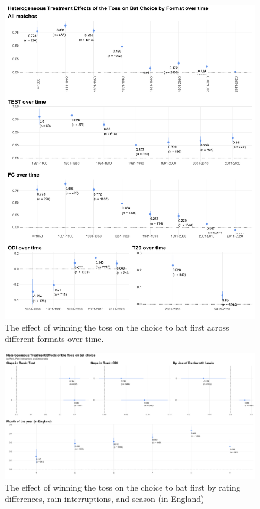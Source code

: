 \documentclass[12pt, letterpaper]{article}
\begin{document}
\begin{figure}
 \centering
 \includegraphics[scale=.5]{output/first_stage_by_format_overtime.pdf}
 \caption{The effect of winning the toss on the choice to bat first across different formats over time.}
 \label{fig:fs_het_TE2}
\end{figure}

\clearpage

\begin{figure}
 \centering
 \includegraphics[scale=.5]{output/first_stage_by_rank_dl_season.pdf}
 \caption{The effect of winning the toss on the choice to bat first by rating differences, rain-interruptions, and season (in England)}
 \label{fig:fs_het_TE3}
\end{figure}
\end{document}
